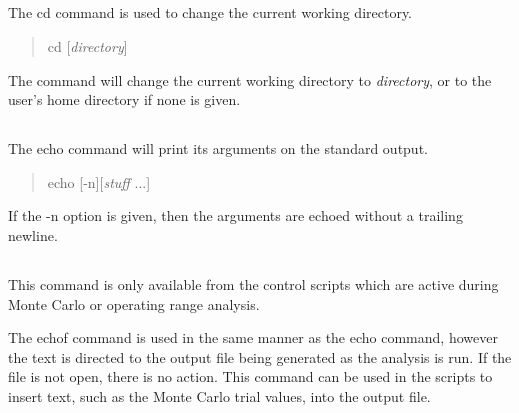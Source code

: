 \subsection{}


The {\cb cd} command is used to change the current working directory.
\begin{quote}\vt
cd [{\it directory\/}]
\end{quote}
The command will change the current working directory to {\it
directory\/}, or to the user's home directory if none is given.

\subsection{}


The {\cb echo} command will print its arguments on the standard output.
\begin{quote}\vt
echo [-n][{\it stuff} ...]
\end{quote}
If the {\vt -n} option is given, then the arguments are echoed without
a trailing newline.

\subsection{}


This command is only available from the control scripts which are
active during Monte Carlo or operating range analysis. 

The {\cb echof} command is used in the same manner as the {\cb echo}
command, however the text is directed to the output file being
generated as the analysis is run.  If the file is not open, there is
no action.  This command can be used in the scripts to insert text,
such as the Monte Carlo trial values, into the output file.

\subsection{}

